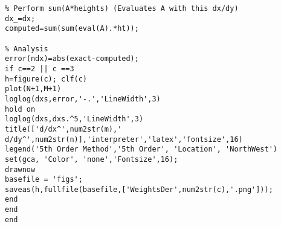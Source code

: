 \begin{singlespace}
\begin{lstlisting}
% Perform sum(A*heights) (Evaluates A with this dx/dy)
dx_=dx;
computed=sum(sum(eval(A).*ht));

% Analysis
error(ndx)=abs(exact-computed);
if c==2 || c ==3 
h=figure(c); clf(c)  
plot(N+1,M+1)
loglog(dxs,error,'-.','LineWidth',3)
hold on
loglog(dxs,dxs.^5,'LineWidth',3)
title(['d/dx^',num2str(m),' d/dy^',num2str(n)],'interpreter','latex','fontsize',16)
legend('5th Order Method','5th Order', 'Location', 'NorthWest')
set(gca, 'Color', 'none','Fontsize',16);
drawnow 
basefile = 'figs';
saveas(h,fullfile(basefile,['WeightsDer',num2str(c),'.png']));
end
end
end
\end{lstlisting}
\end{singlespace}